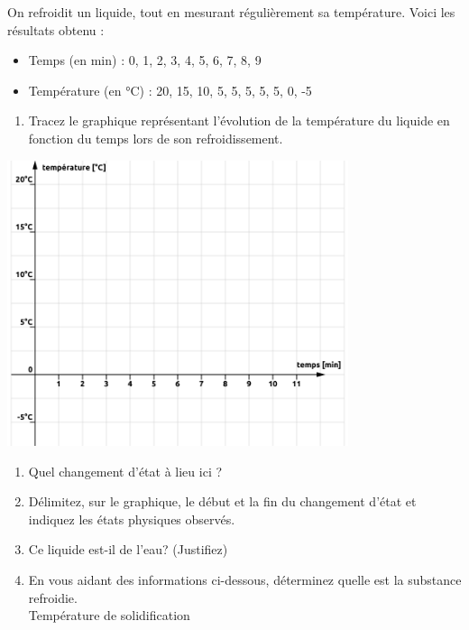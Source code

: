 \documentclass[
  11pt,
  a4paper,
  openany]{book}
\providecommand{\tightlist}{%
  \setlength{\itemsep}{0pt}\setlength{\parskip}{0pt}}
\begin{document}
\begin{Exercise}

On refroidit un liquide, tout en mesurant régulièrement sa température. Voici les résultats obtenu :

\begin{itemize}
\tightlist
\item
  Temps (en min) : 0, 1, 2, 3, 4, 5, 6, 7, 8, 9
\item
  Température (en °C) : 20, 15, 10, 5, 5, 5, 5, 5, 0, -5
\end{itemize}

\begin{enumerate}
\def\labelenumi{\arabic{enumi}.}
\tightlist
\item
  Tracez le graphique représentant l'évolution de la température du liquide en fonction du temps lors de son refroidissement.
\end{enumerate}

\begin{center}
\includegraphics[width=0.75\textwidth,height=\textheight]{images/graph-cyclohexane.png}

\end{center}

\begin{enumerate}
\def\labelenumi{\arabic{enumi}.}
\setcounter{enumi}{1}
\tightlist
\item
  Quel changement d'état à lieu ici ?\\
\item
  Délimitez, sur le graphique, le début et la fin du changement d'état et indiquez les états physiques observés.
\item
  Ce liquide est-il de l'eau? (Justifiez)
\item
  En vous aidant des informations ci-dessous, déterminez quelle est la substance refroidie.\\
  Température de solidification\\
\end{enumerate}


\end{Exercise}
\end{document}
